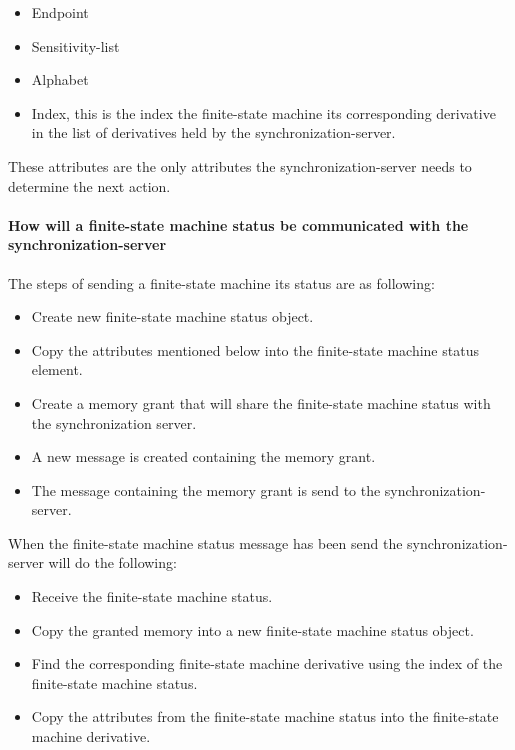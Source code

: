 \begin{itemize}
\tightlist
\item
  Endpoint
\item
  Sensitivity-list
\item
  Alphabet
\item
  Index, this is the index the finite-state machine its corresponding
  derivative in the list of derivatives held by the
  synchronization-server.
\end{itemize}

These attributes are the only attributes the synchronization-server
needs to determine the next action.

\hypertarget{how-will-a-finite-state-machine-status-be-communicated-with-the-synchronization-server}{%
\paragraph{How will a finite-state machine status be communicated with
the
synchronization-server}\label{how-will-a-finite-state-machine-status-be-communicated-with-the-synchronization-server}}

The steps of sending a finite-state machine its status are as following:

\begin{itemize}
\tightlist
\item
  Create new finite-state machine status object.
\item
  Copy the attributes mentioned below into the finite-state machine
  status element.
\item
  Create a memory grant that will share the finite-state machine status
  with the synchronization server.
\item
  A new message is created containing the memory grant.
\item
  The message containing the memory grant is send to the
  synchronization-server.
\end{itemize}

When the finite-state machine status message has been send the
synchronization-server will do the following:

\begin{itemize}
\tightlist
\item
  Receive the finite-state machine status.
\item
  Copy the granted memory into a new finite-state machine status object.
\item
  Find the corresponding finite-state machine derivative using the index
  of the finite-state machine status.
\item
  Copy the attributes from the finite-state machine status into the
  finite-state machine derivative.
\end{itemize}

